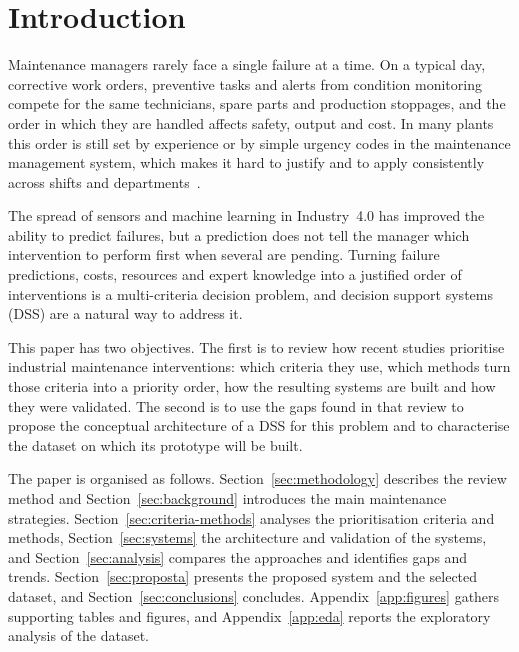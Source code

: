 \section{Introduction}
\label{sec:intro}

Maintenance managers rarely face a single failure at a time. On a typical day, corrective work orders, preventive tasks and alerts from condition monitoring compete for the same technicians, spare parts and production stoppages, and the order in which they are handled affects safety, output and cost. In many plants this order is still set by experience or by simple urgency codes in the maintenance management system, which makes it hard to justify and to apply consistently across shifts and departments~\cite{astepe2021,gopalakrishnan2022}.

The spread of sensors and machine learning in Industry~4.0 has improved the ability to predict failures, but a prediction does not tell the manager which intervention to perform first when several are pending. Turning failure predictions, costs, resources and expert knowledge into a justified order of interventions is a multi-criteria decision problem, and decision support systems (DSS) are a natural way to address it.

This paper has two objectives. The first is to review how recent studies prioritise industrial maintenance interventions: which criteria they use, which methods turn those criteria into a priority order, how the resulting systems are built and how they were validated. The second is to use the gaps found in that review to propose the conceptual architecture of a DSS for this problem and to characterise the dataset on which its prototype will be built.

The paper is organised as follows. Section~\ref{sec:methodology} describes the review method and Section~\ref{sec:background} introduces the main maintenance strategies. Section~\ref{sec:criteria-methods} analyses the prioritisation criteria and methods, Section~\ref{sec:systems} the architecture and validation of the systems, and Section~\ref{sec:analysis} compares the approaches and identifies gaps and trends. Section~\ref{sec:proposta} presents the proposed system and the selected dataset, and Section~\ref{sec:conclusions} concludes. Appendix~\ref{app:figures} gathers supporting tables and figures, and Appendix~\ref{app:eda} reports the exploratory analysis of the dataset.